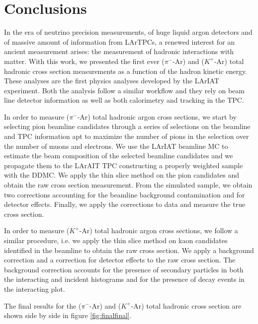 \chapter{Conclusions}\label{ch:Conclusions}
In the era of neutrino precision measurements, of huge liquid argon detectors and of massive amount of information from LArTPCs, a renewed interest for an ancient measurement arises: the measurement of hadronic interactions with matter. With this work, we presented the first ever ($\pi^-$-Ar) and ($K^+$-Ar) total hadronic cross section measurements as a function of the hadron kinetic energy. These analyses are the first physics analyses developed by the LArIAT experiment.
Both the analysis follow a similar workflow and  they rely on beam line detector information as well as both calorimetry and tracking in the TPC. 


In order to measure ($\pi^-$-Ar) total hadronic  argon cross sections, we start by selecting pion beamline candidates through a series of selections on the beamline and TPC information apt to maximize the number of pions in the selection over the number of muons and electrons. We use the LArIAT beamline MC to estimate the beam composition of the selected beamline candidates and we propagate them to the LArAIT TPC constructing a properly weighted sample with the DDMC. We apply the thin slice method on the pion candidates and obtain the raw cross section measurement. From the simulated sample, we obtain two corrections accounting for the beamline background contamination and for detector effects. Finally, we apply the corrections to data and measure the true cross section.

In order to measure ($K^+$-Ar) total hadronic  argon cross sections, we follow a similar procedure, i.e. we apply the thin slice method on kaon candidates identified in the beamline to obtain the raw cross section. We apply a background correction and a correction for detector effects to the raw cross section.
The background correction accounts for the presence of secondary particles in both the interacting and incident histograms and for the presence of decay events in the interacting plot.

The final results for the ($\pi^-$-Ar) and ($K^+$-Ar) total hadronic cross section are shown side by side in figure \ref{fig:finalfinal}.

